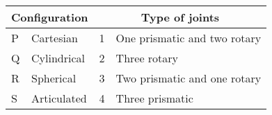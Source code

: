 \begin{center}
\begin{tabular}{|p{1cm}|p{4cm}|p{1cm}|p{7cm}|}
\hline
\multicolumn{2}{|c|}{Configuration} & \multicolumn{2}{c|}{Type of joints} \\
\hline
P & Cartesian & 1 & One prismatic and two rotary \\
\hline
Q & Cylindrical & 2 & Three rotary \\
\hline
R & Spherical & 3 & Two prismatic and one rotary \\
\hline
S & Articulated & 4 & Three prismatic \\
\hline
\end{tabular}
\end{center}